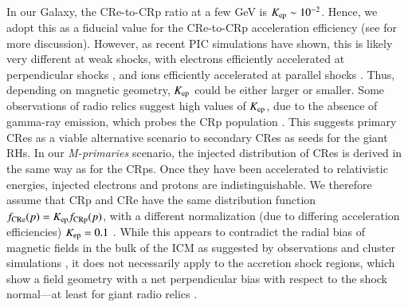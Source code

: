 \documentclass[a4paper,fleqn,usenatbib]{mnras}
\begin{document}
In our Galaxy, the CRe-to-CRp ratio at a few GeV is $K_{{\mathrm{ep}}} \sim
10^{-2}$. Hence, we adopt this as a fiducial value for the CRe-to-CRp
acceleration efficiency (see \cite{pinzke13} for more
discussion). However, as recent PIC simulations have shown, this is
likely very different at weak shocks, with electrons efficiently
accelerated at perpendicular shocks
\citep{2014ApJ...794..153G,2014ApJ...797...47G}, and ions efficiently
accelerated at parallel shocks \citep{2014ApJ...783...91C}. Thus,
depending on magnetic geometry, $K_{{\mathrm{ep}}}$ could be either larger
or smaller. Some observations of radio relics suggest high values of
$K_{{\mathrm{ep}}}$, due to the absence of gamma-ray emission, which probes
the CRp population \citep{2014MNRAS.437.2291V}. This suggests primary
CRes as a viable alternative scenario to secondary CRes as seeds for
the giant RHs. In our {\em M-primaries} scenario, the injected
distribution of CRes is derived in the same way as for the CRps. Once
they have been accelerated to relativistic energies, injected
electrons and protons are indistinguishable. We therefore assume that
CRp and CRe have the same distribution function $f_{\mathrm{CRe}}(p) =
K_{\mathrm{ep}} f_{\mathrm{CRp}}(p)$, with a different normalization (due to
differing acceleration efficiencies) $K_{\mathrm{ep}}=0.1$ \citep[which is
  viable for primarily perpendicular
  shocks][]{2014ApJ...794..153G}. While this appears to contradict the
radial bias of magnetic fields in the bulk of the ICM as suggested by
observations \citep{2010NatPh...6..520P} and cluster simulations
\citep{2011ApJ...740...81R}, it does not necessarily apply to the
accretion shock regions, which show a field geometry with a net
perpendicular bias with respect to the shock normal---at least for
giant radio relics \citep{2010Sci...330..347V}.


\end{document}
